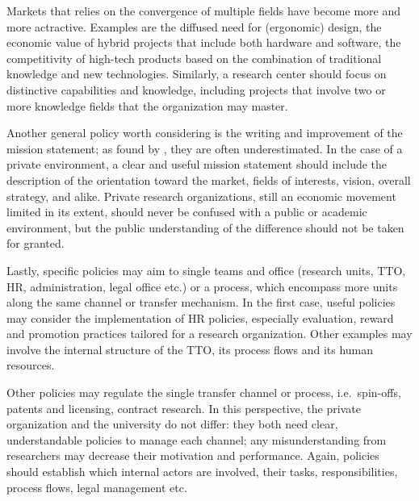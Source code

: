Markets that relies on the convergence of multiple fields have become more and more actractive. Examples are the diffused need for (ergonomic) design, the economic value of hybrid projects that include both hardware and software, the competitivity of high-tech products based on the combination of traditional knowledge and new technologies. Similarly, a research center should focus on distinctive capabilities and knowledge, including projects that involve two or more knowledge fields that the organization may master. 
 
Another general policy worth considering is the writing and improvement of the mission statement; as found by \citet{Fitzgerald2015}, they are often underestimated. In the case of a private environment, a clear and useful mission statement should include the description of the orientation toward the market, fields of interests, vision, overall strategy, and alike. Private research organizations, still an economic movement limited in its extent, should never be confused with a public or academic environment, but the public understanding of the difference should not be taken for granted. 

Lastly, specific policies may aim to single teams and office (research units, TTO, HR, administration, legal office etc.) or a process, which encompass more units along the same channel or transfer mechanism. In the first case, useful policies may consider the implementation of HR policies, especially evaluation, reward and promotion practices tailored for a research organization. Other examples may involve the internal structure of the TTO, its process flows and its human resources.

Other policies may regulate the single transfer channel or process, i.e.\ spin-offs, patents and licensing, contract research. In this perspective, the private organization and the university do not differ: they both need clear, understandable policies to manage each channel; any misunderstanding from researchers may decrease their motivation and performance. Again, policies should establish which internal actors are involved, their tasks, responsibilities, process flows, legal management etc.
